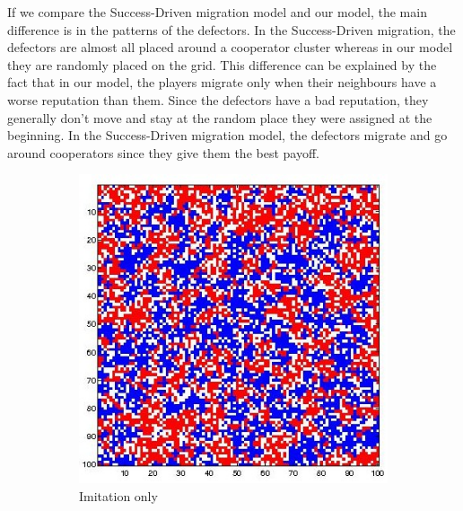 \documentclass[11pt]{article}
\begin{document}
If we compare the Success-Driven migration model and our model, the main difference is in the patterns of the defectors. In the Success-Driven migration, the defectors are almost all placed around a cooperator cluster whereas in our model they are randomly placed on the grid. This difference can be explained by the fact that in our model, the players migrate only when their neighbours have a worse reputation than them. Since the defectors have a bad reputation, they generally don't move and stay at the random place they were assigned at the beginning. In the Success-Driven migration model, the defectors migrate and go around cooperators since they give them the best payoff.


\begin{figure}[H]
	\centering
	\begin{subfigure}[t]{0.3\textwidth}
        \includegraphics[width=\textwidth]{../../other/grids/m0-t200-a5-g300.jpg}
	\caption{Imitation only}
	\label{fig:grids_imitation0}
    	\end{subfigure}
	\begin{subfigure}[t]{0.3\textwidth}

\end{subfigure}
\end{figure}
\end{document}
